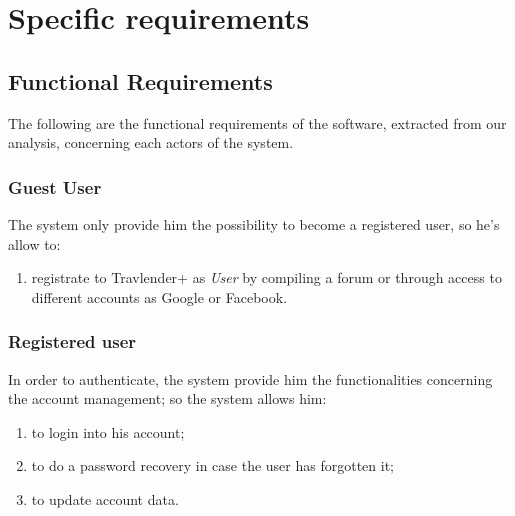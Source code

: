 \chapter{Specific requirements}
\label{cha:requirements}

\section{Functional Requirements}
The following are the functional requirements of the software, extracted from our analysis, concerning each actors of the system.

\subsection*{Guest User}
The system only provide him the possibility to become a registered user, so he's allow to:
\begin{enumerate}
	\item registrate to Travlender+ as \textit{User} by compiling a forum or through access to 			different accounts as Google or Facebook.
\end{enumerate}

\subsection*{Registered user}
In order to authenticate, the system provide him the functionalities concerning the account management; so the system allows him:
\begin{enumerate}[resume]
	\item to login into his account;
	\item to do a password recovery in case the user has forgotten it;
	\item to update account data.
\end{enumerate}

